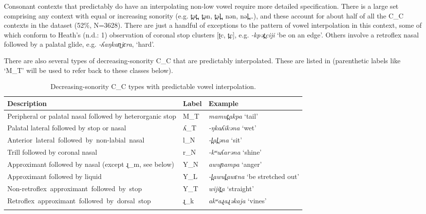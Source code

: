 \documentclass[output=paper,colorlinks,citecolor=brown]{langscibook}
\begin{document}
Consonant contexts that predictably do have an interpolating non-low vowel require more detailed specification. There is a large set comprising any context with equal or increasing sonority (e.g. t̪ət̪, t̪ən, t̪əl̪, nən, nəl̪…), and these account for about half of all the \textsc{C\_C} contexts in the dataset (52\%, N=3628). There are just a handful of exceptions to the pattern of vowel interpolation in this context, some of which conform to Heath’s (n.d.: 1) observation of coronal stop clusters [ʈc, t̪c], e.g. \textit{\nobreakdash-kpə}\textit{t̪ciji} ‘be on an edge’. Others involve a retroflex nasal followed by a palatal glide, e.g. \textit{{}-ʎaŋkaɳjɛra}, ‘hard’.

There are also several types of decreasing-sonority \textsc{C\_C} that are predictably interpolated. These are listed in  (parenthetic labels like ‘\textsc{M\_T}’ will be used to refer back to these classes below). 

\begin{table}
\small
\begin{tabularx}{\textwidth}{Ql@{~~}l@{}}
\lsptoprule
{Description} & {Label} & {Example}\\
\midrule
Peripheral or palatal nasal followed by heterorganic stop & M\_T & \textit{mamut̪akpa} ‘tail’\\
\tablevspace
Palatal lateral followed by stop or nasal & ʎ\_T & \textit{{}-ŋkaʎikəna} ‘wet’\\
\tablevspace
\mbox{Anterior lateral followed by non-labial nasal} & l\_N & \textit{{}-l̪al̪əna} ‘sit’\\
\tablevspace
Trill followed by coronal nasal & r\_N & \textit{{}-kʷuʎarəna} ‘shine’\\
\tablevspace
Approximant followed by nasal (except ɻ\_m, see below) & Y\_N & \textit{awuɲampa} ‘anger’\\
\tablevspace
Approximant followed by liquid & Y\_L & \textit{{}-l̪awul̪awɛna} ‘be stretched out’\\
\tablevspace
\mbox{Non-retroflex approximant followed by stop} & Y\_T & \textit{wijit̪a} ‘straight’\\
\tablevspace
\mbox{Retroflex approximant followed by dorsal stop} & ɻ\_k & \textit{akʷaɻaɻəkaja} ‘vines’\\
\lspbottomrule
\end{tabularx}
\caption{Decreasing-sonority \textsc{C\_C} types with predictable vowel interpolation.}
\label{tab:mansfield:2}
\end{table}
\end{document}
